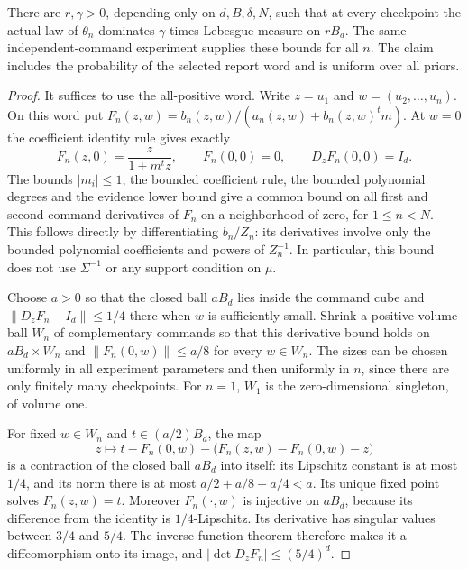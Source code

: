 \begin{lemma}
\label{lem:algebra-acquired-density}
There are $r,\gamma>0$, depending only on $d,B,\delta,N$, such that
at every checkpoint the actual law of $\theta_n$ dominates
$\gamma$ times Lebesgue measure on $rB_d$. The same independent-command
experiment supplies these bounds for all $n$. The claim includes the
probability of the selected report word and is uniform over all priors.
\end{lemma}
\begin{proof}
It suffices to use the all-positive word. Write $z=u_1$ and
$w=(u_2,\ldots,u_n)$. On this word put
$F_n(z,w)=b_n(z,w)/(a_n(z,w)+b_n(z,w)^tm)$.
At $w=0$ the coefficient identity rule gives exactly
\[
 F_n(z,0)=\frac{z}{1+m^tz},\qquad F_n(0,0)=0,
                \qquad D_zF_n(0,0)=I_d.
\]
The bounds $|m_i|\le1$, the bounded coefficient rule, the bounded
polynomial degrees and the evidence lower bound give a common bound
on all first and second command derivatives of $F_n$ on a neighborhood
of zero, for $1\le n<N$. This follows directly by differentiating
$b_n/Z_n$: its derivatives involve only the bounded polynomial
coefficients and powers of $Z_n^{-1}$. In particular, this bound does
not use $\Sigma^{-1}$ or any support condition on $\mu$.

Choose $a>0$ so that the closed ball $aB_d$ lies inside the command
cube and $\|D_zF_n-I_d\|\le1/4$ there when $w$ is sufficiently
small. Shrink a positive-volume ball $W_n$ of complementary commands
so that this derivative bound holds on $aB_d\times W_n$ and
$\|F_n(0,w)\|\le a/8$ for every $w\in W_n$.
The sizes can be chosen uniformly in all experiment parameters and
then uniformly in $n$, since there are only finitely many checkpoints.
For $n=1$, $W_1$ is the zero-dimensional singleton, of volume one.

For fixed $w\in W_n$ and $t\in(a/2)B_d$, the map
\[
 z\longmapsto t-F_n(0,w)-\bigl(F_n(z,w)-F_n(0,w)-z\bigr)
\]
is a contraction of the closed ball $aB_d$ into itself: its Lipschitz
constant is at most $1/4$, and its norm there is at most
$a/2+a/8+a/4<a$. Its unique fixed point solves $F_n(z,w)=t$.
Moreover $F_n(\cdot,w)$ is injective on $aB_d$, because its difference
from the identity is $1/4$-Lipschitz. Its derivative has singular
values between $3/4$ and $5/4$. The inverse function theorem therefore
makes it a diffeomorphism onto its image, and
$|\det D_zF_n|\le(5/4)^d$.


\end{proof}
